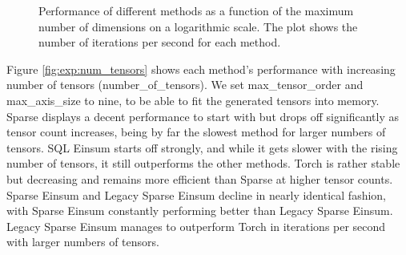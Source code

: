 \begin{figure}[H]
    \caption{Performance of different methods as a function of the maximum number of dimensions on a logarithmic scale.
        The plot shows the number of iterations per second for each method.}
    \label{fig:exp:max_num_dim}
\end{figure}

\noindent
Figure \ref{fig:exp:num_tensors} shows each method's performance with increasing number of tensors
(number\_of\_tensors). We set max\_tensor\_order and max\_axis\_size to nine,
to be able to fit the generated tensors into memory. Sparse displays a decent performance to start with but
drops off significantly as tensor count increases, being by far the slowest method for larger numbers of
tensors. SQL Einsum starts off strongly, and while it gets slower with the rising number of tensors, it
still outperforms the other methods. Torch is rather stable but decreasing and remains more efficient than
Sparse at higher tensor counts. Sparse Einsum and Legacy Sparse Einsum decline in nearly identical
fashion, with Sparse Einsum constantly performing better than Legacy Sparse Einsum. Legacy Sparse Einsum
manages to outperform Torch in iterations per second with larger numbers of tensors.

